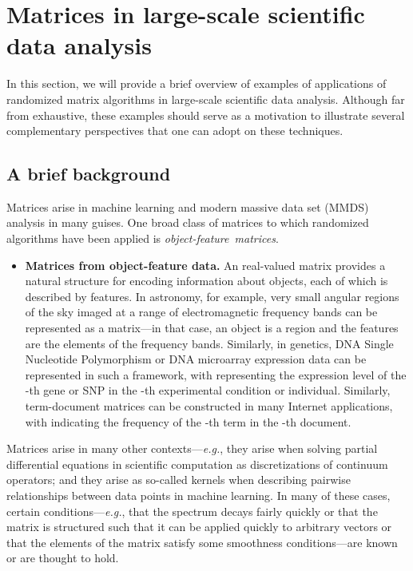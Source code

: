\documentclass[twoside]{article}
\begin{document}
 \section{Matrices in large-scale scientific data analysis}
\label{sxn:background1}

In this section, we will provide a brief overview of examples of 
applications of randomized matrix algorithms in large-scale scientific data 
analysis.
Although far from exhaustive, these examples should serve as a motivation to 
illustrate several complementary perspectives that one can adopt on these 
techniques.

\subsection{A brief background}
\label{sxn:background1-brief}

Matrices arise in machine learning and modern massive data set (MMDS) 
analysis in many guises.
One broad class of matrices to which randomized algorithms have been applied 
is \emph{object-feature~matrices}. 
\begin{itemize}
\item
\textbf{Matrices from object-feature data.}
An  real-valued matrix  provides a natural structure for 
encoding information about  objects, each of which is described by  
features.
In astronomy, for example, very small angular regions of the sky imaged at 
a range of electromagnetic frequency bands can be represented as a matrix---in 
that case, an object is a region and the features are the elements of the 
frequency bands.
Similarly, in genetics, DNA Single Nucleotide Polymorphism or DNA 
microarray expression data can be represented in such a framework, with 
 representing the expression level of the -th gene or SNP in 
the -th experimental condition or individual. 
Similarly, term-document matrices can be constructed in many Internet 
applications, with  indicating the frequency of the -th term in 
the -th document. 
\end{itemize}
Matrices arise in many other contexts---\emph{e.g.}, they arise when solving
partial differential equations in scientific computation as discretizations
of continuum operators; and they arise as so-called kernels when describing 
pairwise relationships between data points in machine learning.
In many of these cases, certain conditions---\emph{e.g.}, that the spectrum
decays fairly quickly or that the matrix is structured such that it can be 
applied quickly to arbitrary vectors or that the elements of the matrix 
satisfy some smoothness conditions---are known or are thought to hold.
\end{document}
